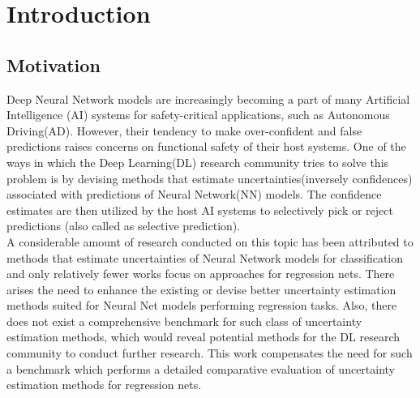 

    \chapter{Introduction}
    \section{Motivation}
    Deep Neural Network models are increasingly becoming a part of many Artificial Intelligence (AI) systems for safety-critical applications, such as Autonomous Driving(AD)\cite{feng2018towards}. However, their tendency to make over-confident and false predictions raises concerns on functional safety of their host systems. One of the ways in which the Deep Learning(DL) research community tries to solve this problem is by devising methods that estimate uncertainties(inversely confidences) associated with predictions of Neural Network(NN) models. The confidence estimates are then utilized by the host AI systems to selectively pick or reject predictions (also called as selective prediction).\\ 
    A considerable amount of research conducted on this topic has been attributed to methods that estimate uncertainties of Neural Network models for classification and only relatively fewer works focus on approaches for regression nets. There arises the need to enhance the existing or devise better uncertainty estimation methods suited for Neural Net models performing regression tasks. Also, there does not exist a comprehensive benchmark for such class of uncertainty estimation methods, which would reveal potential methods for the DL research community to conduct further research. This work compensates the need for such a benchmark which performs a detailed comparative evaluation of uncertainty estimation methods for regression nets.
